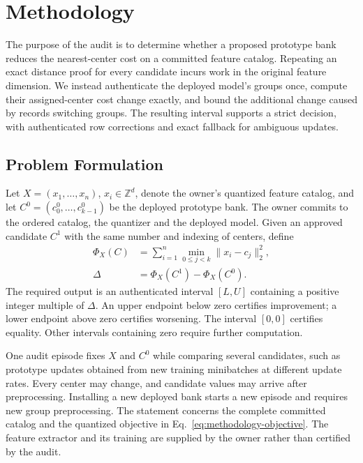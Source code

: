 \section{Methodology}
\label{sec:methodology}
The purpose of the audit is to determine whether a proposed prototype bank
reduces the nearest-center cost on a committed feature catalog. Repeating an
exact distance proof for every candidate incurs work in the original feature
dimension. We instead authenticate the deployed model's groups once, compute
their assigned-center cost change exactly, and bound the additional change
caused by records switching groups. The resulting interval supports a strict
decision, with authenticated row corrections and exact fallback for ambiguous
updates.

\subsection{Problem Formulation}
\label{sec:methodology-problem}
Let $X=(x_1,\ldots,x_n)$, $x_i\in\mathbb Z^d$, denote the owner's quantized
feature catalog, and let $C^0=(c^0_0,\ldots,c^0_{k-1})$ be the deployed
prototype bank. The owner commits to the ordered catalog, the quantizer and
the deployed model. Given an approved candidate $C^1$ with the same number
and indexing of centers, define
\begin{equation}
 \begin{aligned}
 \Phi_X(C)&=\sum_{i=1}^{n}\min_{0\leq j<k}\|x_i-c_j\|_2^2,\\
 \Delta&=\Phi_X(C^1)-\Phi_X(C^0).
 \end{aligned}
 \label{eq:methodology-objective}
\end{equation}
The required output is an authenticated interval $[L,U]$ containing a
positive integer multiple of $\Delta$. An upper endpoint below zero
certifies improvement; a lower endpoint above zero certifies worsening.
The interval $[0,0]$ certifies equality. Other intervals containing zero
require further computation.

One audit episode fixes $X$ and $C^0$ while comparing several candidates,
such as prototype updates obtained from new training minibatches at different
update rates. Every center may change, and candidate values may arrive after
preprocessing. Installing a new deployed bank starts a new episode and
requires new group preprocessing. The statement concerns the complete
committed catalog and the quantized objective in
Eq.~\eqref{eq:methodology-objective}. The feature extractor and its training
are supplied by the owner rather than certified by the audit.

